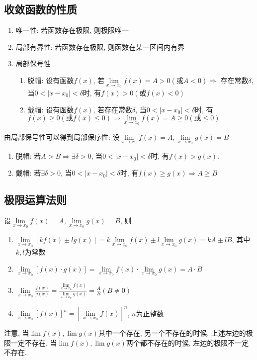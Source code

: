\subsection{收敛函数的性质}
\begin{enumerate}
    \item 唯一性: 若函数存在极限, 则极限唯一
    \item 局部有界性: 若函数存在极限, 则函数在某一区间内有界
    \item 局部保号性
          \begin{enumerate}
              \item 脱帽: 设有函数$ f(x) $, 若$ \lim\limits_{x\rightarrow x_{0}}f(x)=A>0(\text{或}A<0) \Rightarrow $ 存在常数$ \delta $, 当$ 0<|x-x_{0}|<\delta $时, 有$ f(x)>0(\text{或}f(x)<0) $
              \item 戴帽: 设有函数$ f(x) $, 若存在常数$ \delta $, 当$ 0<|x-x_{0}|<\delta $时, 有$ f(x)\ge 0(\text{或}f(x)\le 0) \Rightarrow \lim\limits_{x\rightarrow x_{0}}f(x)=A\ge 0(\text{或}\le 0) $
          \end{enumerate}
\end{enumerate}
\begin{tcolorbox}
    由局部保号性可以得到局部保序性: 设$ \lim\limits_{x \rightarrow x_{0}}f(x)=A, \lim\limits_{x \rightarrow x_{0}}g(x)=B $
    \begin{enumerate}
        \item 脱帽: 若$ A>B\Rightarrow \exists \delta>0 $, 当$ 0<|x-x_{0}|<\delta $时, 有$ f(x)>g(x) $.
        \item 戴帽: 若$ \exists \delta>0 $, 当$ 0<|x-x_{0}|<\delta $时, 有$ f(x)\ge g(x)\Rightarrow A\ge B $
    \end{enumerate}
\end{tcolorbox}
\subsection{极限运算法则}
设$ \lim\limits_{x\rightarrow x_{0}}f(x)=A, \lim\limits_{x\rightarrow x_{0}}g(x)=B $, 则
\begin{enumerate}
    \item $ \lim\limits_{x\rightarrow x_{0}}[kf(x)\pm lg(x)]=k \lim\limits_{x\rightarrow x_{0}}f(x)\pm l \lim\limits_{x\rightarrow x_{0}}g(x)=kA\pm lB $, 其中$ k,l $为常数
    \item $ \lim\limits_{x\rightarrow x_{0}}[f(x)\cdot g(x)]=\lim\limits_{x\rightarrow x_{0}}f(x)\cdot \lim\limits_{x\rightarrow x_{0}}g(x)=A\cdot B $
    \item $ \lim\limits_{x\rightarrow x_{0}}\frac{f(x)}{g(x)}=\frac{\lim\limits_{x\rightarrow x_{0}}f(x)}{\lim\limits_{x\rightarrow x_{0}}g(x)}=\frac{A}{B}(B\neq 0) $
    \item $ \lim\limits_{x\rightarrow x_{0}}[f(x)]^{n}=[\lim\limits_{x\rightarrow x_{0}}f(x)]^{n} $, $ n $为正整数
\end{enumerate}\par
注意, 当$ \lim\limits f(x), \lim\limits g(x) $其中一个存在, 另一个不存在的时候, 上述左边的极限一定不存在. 当$ \lim\limits f(x), \lim\limits g(x) $两个都不存在的时候, 左边的极限不一定不存在.
